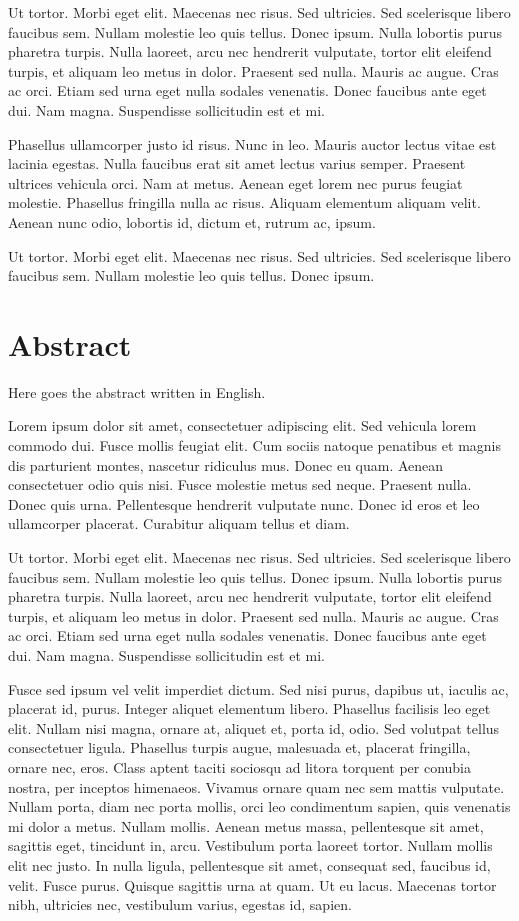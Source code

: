 Ut tortor. Morbi eget elit. Maecenas nec risus. Sed ultricies. Sed
scelerisque libero faucibus sem. Nullam molestie leo quis
tellus. Donec ipsum. Nulla lobortis purus pharetra turpis. Nulla
laoreet, arcu nec hendrerit vulputate, tortor elit eleifend turpis, et
aliquam leo metus in dolor. Praesent sed nulla. Mauris ac augue. Cras
ac orci. Etiam sed urna eget nulla sodales venenatis. Donec faucibus
ante eget dui. Nam magna. Suspendisse sollicitudin est et mi. 

Phasellus ullamcorper justo id risus. Nunc in leo. Mauris auctor
lectus vitae est lacinia egestas. Nulla faucibus erat sit amet lectus
varius semper. Praesent ultrices vehicula orci. Nam at metus. Aenean
eget lorem nec purus feugiat molestie. Phasellus fringilla nulla ac
risus. Aliquam elementum aliquam velit. Aenean nunc odio, lobortis id,
dictum et, rutrum ac, ipsum. 

Ut tortor. Morbi eget elit. Maecenas nec risus. Sed ultricies. Sed
scelerisque libero faucibus sem. Nullam molestie leo quis
tellus. Donec ipsum. 

\chapter*{Abstract}

Here goes the abstract written in English.

Lorem ipsum dolor sit amet, consectetuer adipiscing elit. Sed vehicula
lorem commodo dui. Fusce mollis feugiat elit. Cum sociis natoque
penatibus et magnis dis parturient montes, nascetur ridiculus
mus. Donec eu quam. Aenean consectetuer odio quis nisi. Fusce molestie
metus sed neque. Praesent nulla. Donec quis urna. Pellentesque
hendrerit vulputate nunc. Donec id eros et leo ullamcorper
placerat. Curabitur aliquam tellus et diam. 

Ut tortor. Morbi eget elit. Maecenas nec risus. Sed ultricies. Sed
scelerisque libero faucibus sem. Nullam molestie leo quis
tellus. Donec ipsum. Nulla lobortis purus pharetra turpis. Nulla
laoreet, arcu nec hendrerit vulputate, tortor elit eleifend turpis, et
aliquam leo metus in dolor. Praesent sed nulla. Mauris ac augue. Cras
ac orci. Etiam sed urna eget nulla sodales venenatis. Donec faucibus
ante eget dui. Nam magna. Suspendisse sollicitudin est et mi. 

Fusce sed ipsum vel velit imperdiet dictum. Sed nisi purus, dapibus
ut, iaculis ac, placerat id, purus. Integer aliquet elementum
libero. Phasellus facilisis leo eget elit. Nullam nisi magna, ornare
at, aliquet et, porta id, odio. Sed volutpat tellus consectetuer
ligula. Phasellus turpis augue, malesuada et, placerat fringilla,
ornare nec, eros. Class aptent taciti sociosqu ad litora torquent per
conubia nostra, per inceptos himenaeos. Vivamus ornare quam nec sem
mattis vulputate. Nullam porta, diam nec porta mollis, orci leo
condimentum sapien, quis venenatis mi dolor a metus. Nullam
mollis. Aenean metus massa, pellentesque sit amet, sagittis eget,
tincidunt in, arcu. Vestibulum porta laoreet tortor. Nullam mollis
elit nec justo. In nulla ligula, pellentesque sit amet, consequat sed,
faucibus id, velit. Fusce purus. Quisque sagittis urna at quam. Ut eu
lacus. Maecenas tortor nibh, ultricies nec, vestibulum varius, egestas
id, sapien. 

